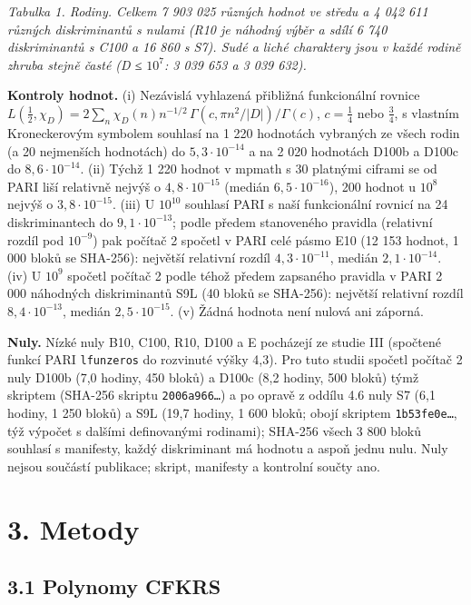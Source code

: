 \documentclass[
  10pt,
]{article}
\begin{document}
\emph{Tabulka 1. Rodiny. Celkem 7 903 025 různých hodnot ve středu a 4
042 611 různých diskriminantů s nulami (R10 je náhodný výběr a sdílí 6
740 diskriminantů s C100 a 16 860 s S7). Sudé a liché charaktery jsou v
každé rodině zhruba stejně časté (\textbar D\textbar{} ≤ \(10^7\): 3 039
653 a 3 039 632).}

\textbf{Kontroly hodnot.} (i) Nezávislá vyhlazená přibližná funkcionální
rovnice
\(L(\tfrac12, \chi_D) = 2\sum_n \chi_D(n) n^{-1/2}\,\Gamma(c, \pi n^2/|D|)/\Gamma(c)\),
\(c = \tfrac14\) nebo \(\tfrac34\), s vlastním Kroneckerovým symbolem
souhlasí na 1 220 hodnotách vybraných ze všech rodin (a 20 nejmenších
hodnotách) do \(5{,}3\cdot10^{-14}\) a na 2 020 hodnotách D100b a D100c
do \(8{,}6\cdot10^{-14}\). (ii) Týchž 1 220 hodnot v mpmath s 30
platnými ciframi se od PARI liší relativně nejvýš o
\(4{,}8\cdot10^{-15}\) (medián \(6{,}5\cdot10^{-16}\)), 200 hodnot u
\(10^8\) nejvýš o \(3{,}8\cdot10^{-15}\). (iii) U \(10^{10}\) souhlasí
PARI s naší funkcionální rovnicí na 24 diskriminantech do
\(9{,}1\cdot10^{-13}\); podle předem stanoveného pravidla (relativní
rozdíl pod \(10^{-9}\)) pak počítač 2 spočetl v PARI celé pásmo E10 (12
153 hodnot, 1 000 bloků se SHA-256): největší relativní rozdíl
\(4{,}3\cdot10^{-11}\), medián \(2{,}1\cdot10^{-14}\). (iv) U \(10^9\)
spočetl počítač 2 podle téhož předem zapsaného pravidla v PARI 2 000
náhodných diskriminantů S9L (40 bloků se SHA-256): největší relativní
rozdíl \(8{,}4\cdot10^{-13}\), medián \(2{,}5\cdot10^{-15}\). (v) Žádná
hodnota není nulová ani záporná.

\textbf{Nuly.} Nízké nuly B10, C100, R10, D100 a E pocházejí ze studie
III (spočtené funkcí PARI \texttt{lfunzeros} do rozvinuté výšky 4,3).
Pro tuto studii spočetl počítač 2 nuly D100b (7,0 hodiny, 450 bloků) a
D100c (8,2 hodiny, 500 bloků) týmž skriptem (SHA-256 skriptu
\texttt{2006a966…}) a po opravě z oddílu 4.6 nuly S7 (6,1 hodiny, 1 250
bloků) a S9L (19,7 hodiny, 1 600 bloků; obojí skriptem
\texttt{1b53fe0e…}, týž výpočet s dalšími definovanými rodinami);
SHA-256 všech 3 800 bloků souhlasí s manifesty, každý diskriminant má
hodnotu a aspoň jednu nulu. Nuly nejsou součástí publikace; skript,
manifesty a kontrolní součty ano.

\hypertarget{metody}{%
\section{3. Metody}\label{metody}}

\hypertarget{polynomy-cfkrs}{%
\subsection{3.1 Polynomy CFKRS}\label{polynomy-cfkrs}}
\end{document}
